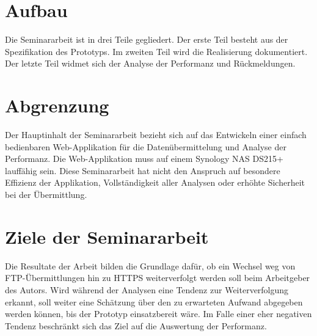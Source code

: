 \section{Aufbau}
Die Seminararbeit ist in drei Teile gegliedert. 
Der erste Teil besteht aus der Spezifikation des Prototyps. 
Im zweiten Teil wird die Realisierung dokumentiert. 
Der letzte Teil widmet sich der Analyse der Performanz und Rückmeldungen.

\section{Abgrenzung}
Der Hauptinhalt der Seminararbeit bezieht sich auf das Entwickeln einer einfach bedienbaren Web-Applikation für die Datenübermittelung und Analyse der Performanz.
Die Web-Applikation muss auf einem Synology NAS DS215+ lauffähig sein.
Diese Seminararbeit hat nicht den Anspruch auf besondere Effizienz der Applikation, 
Vollständigkeit aller Analysen oder erhöhte Sicherheit bei der Übermittlung. 

\section{Ziele der Seminararbeit}
Die Resultate der Arbeit bilden die Grundlage dafür, ob ein Wechsel weg von FTP-Übermittlungen hin zu HTTPS weiterverfolgt werden soll beim Arbeitgeber des Autors.
Wird während der Analysen eine Tendenz zur Weiterverfolgung erkannt, soll weiter eine Schätzung über den zu erwarteten Aufwand abgegeben werden können, bis der Prototyp einsatzbereit wäre.
Im Falle einer eher negativen Tendenz beschränkt sich das Ziel auf die Auswertung der Performanz.
